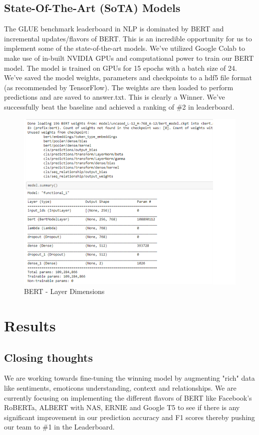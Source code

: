 \documentclass[conference]{IEEEtran}
\begin{document}
\subsection{State-Of-The-Art (SoTA) Models}
The GLUE benchmark leaderboard in NLP is dominated by BERT and incremental updates/flavors of BERT. This is an incredible opportunity for us to implement some of the state-of-the-art models. 
We’ve utilized Google Colab to make use of in-built NVIDIA GPUs and computational power to train our BERT model.
The model is trained on GPUs for 15 epochs with a batch size of 24. We’ve saved the model weights, parameters and checkpoints to a hdf5 file format (as recommended by TensorFlow). The weights are then loaded to perform predictions and are saved to answer.txt.
This is clearly a Winner. We’ve successfully beat the baseline and achieved a ranking of \#2 in leaderboard.
\begin{figure}[htbp]
\centerline{\includegraphics[width=1\columnwidth]{bert.PNG}}
\caption{BERT - Layer Dimensions}
\label{fig3}
\end{figure}

\section{Results}
\subsection{Closing thoughts}
We are working towards fine-tuning the winning model by augmenting "rich" data like sentiments, emoticons understanding, context and relationships. We are currently focusing on implementing the different flavors of BERT like Facebook’s RoBERTa, ALBERT with NAS, ERNIE and Google T5 to see if there is any significant improvement in our prediction accuracy and F1 scores thereby pushing our team to \#1 in the Leaderboard.
\end{document}
